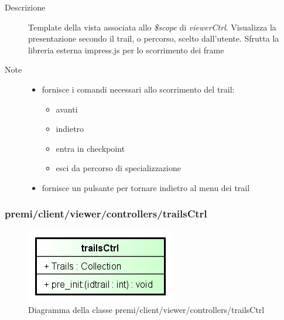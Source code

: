 \begin{description}
\item[Descrizione] \hfill
	Template della vista associata allo \textit{\$scope} di \textit{viewerCtrl}. Visualizza la presentazione secondo il trail, o percorso, scelto dall'utente. Sfrutta la libreria esterna impress.js per lo scorrimento dei frame
\item[Note] \hfill
	\begin{itemize}
			\item fornisce i comandi necessari allo scorrimento del trail:
				\begin{itemize}
					\item avanti
					\item indietro
					\item entra in checkpoint
					\item esci da percorso di specializzazione
				\end{itemize}
			\item fornisce un pulsante per tornare indietro al menu dei trail
	\end{itemize}
\end{description}











\subsubsection{premi/client/viewer/controllers/trailsCtrl}
\begin{figure}[H]
\begin{center}
\includegraphics[scale=0.55]{img/diacla/trailsCtrl.png}
\caption{Diagramma della classe premi/client/viewer/controllers/trailsCtrl}
\end{center}
\end{figure}


